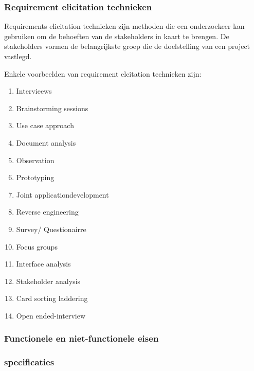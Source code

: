 \subsubsection{Requirement elicitation technieken}

Requirements elicitation technieken zijn methoden die een onderzoekeer kan gebruiken om de behoeften van de stakeholders in kaart te brengen. De stakeholders  vormen de belangrijkste groep die de doelstelling van een project vastlegd.

Enkele voorbeelden van requirement elcitation technieken zijn:


\begin{enumerate}
	\item  Intervieews
	\item  Brainstorming sessions 
	\item  Use case approach 
	\item  Document analysis 
	\item  Observation
	\item  Prototyping
	\item  Joint applicationdevelopment
	\item  Reverse engineering 
	\item  Survey/ Questionairre 
	\item  Focus groups 
	\item  Interface analysis
	\item  Stakeholder analysis 
	\item  Card sorting laddering 
	\item  Open ended-interview
\end{enumerate}
 


 








 







 







 

\subsubsection{Functionele en niet-functionele eisen}

\subsubsection{specificaties}

